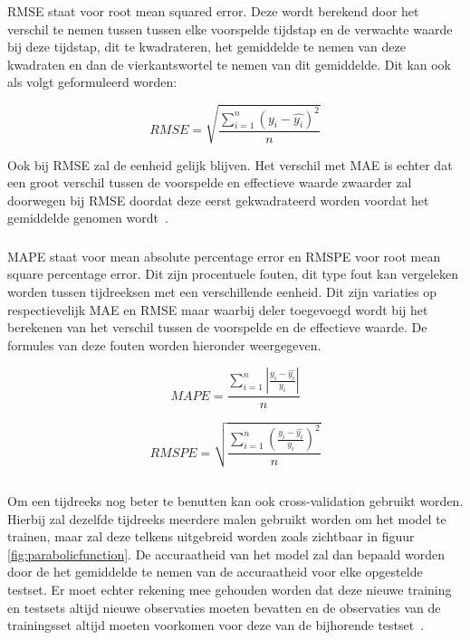 RMSE staat voor root mean squared error. Deze wordt berekend door het verschil te nemen tussen tussen elke voorspelde tijdstap en de verwachte waarde bij deze tijdstap, dit te kwadrateren, het gemiddelde te nemen van deze kwadraten en dan de vierkantswortel te nemen van dit gemiddelde.
Dit kan ook als volgt geformuleerd worden:

\begin{equation}
RMSE = \sqrt{\frac{\sum_{i=1}^{n} (y_i - \hat{y_i})^2}{n}}
\end{equation}

Ook bij RMSE zal de eenheid gelijk blijven. Het verschil met MAE is echter dat een groot verschil tussen de voorspelde en effectieve waarde zwaarder zal doorwegen bij RMSE doordat deze eerst gekwadrateerd worden voordat het gemiddelde genomen wordt~\autocite{Kampakis2020}.

\subsubsection{}

MAPE staat voor mean absolute percentage error en RMSPE voor root mean square percentage error. Dit zijn procentuele fouten, dit type fout kan vergeleken worden tussen tijdreeksen met een verschillende eenheid. Dit zijn variaties op respectievelijk MAE en RMSE maar waarbij deler toegevoegd wordt bij het berekenen van het verschil tussen de voorspelde en de effectieve waarde. De formules van deze fouten worden hieronder weergegeven.

\begin{equation}
MAPE = \frac{\sum_{i=1}^{n} |\frac{y_i - \hat{y_i}}{y_i}|}{n}
\end{equation}

\begin{equation}
RMSPE = \sqrt{\frac{\sum_{i=1}^{n} (\frac{y_i - \hat{y_i}}{y_i})^2}{n}}
\end{equation}

\subsection{}

Om een tijdreeks nog beter te benutten kan ook cross-validation gebruikt worden. Hierbij zal dezelfde tijdreeks meerdere malen gebruikt worden om het model te trainen, maar zal deze telkens uitgebreid worden zoals zichtbaar in figuur \ref{fig:parabolicfunction}. De accuraatheid van het model zal dan bepaald worden door de het gemiddelde te nemen van de accuraatheid voor elke opgestelde testset. Er moet echter rekening mee gehouden worden dat deze nieuwe training en testsets altijd nieuwe observaties moeten bevatten en de observaties van de trainingsset altijd moeten voorkomen voor deze van de bijhorende testset~\autocite{Shrivastava2020}.

